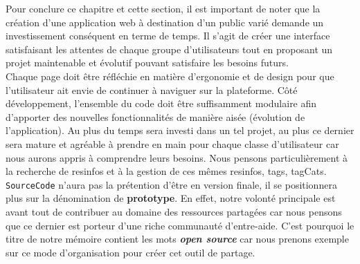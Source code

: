 Pour conclure ce chapitre et cette section, il est important de noter que la création d'une application web à destination d'un public varié demande un investissement conséquent en terme de temps. Il s'agit de créer une interface satisfaisant les attentes de chaque groupe d'utilisateurs tout en proposant un projet maintenable et évolutif pouvant satisfaire les besoins futurs.\\

Chaque page doit être réfléchie en matière d'ergonomie et de design pour que l'utilisateur ait envie de continuer à naviguer sur la plateforme. Côté développement, l'ensemble du code doit être suffisamment modulaire afin d'apporter des nouvelles fonctionnalités de manière aisée (évolution de l'application). Au plus du temps sera investi dans un tel projet, au plus ce dernier sera mature et agréable à prendre en main pour chaque classe d'utilisateur car nous aurons appris à comprendre leurs besoins. Nous pensons particulièrement à la recherche de \glspl{resinfo} et à la gestion de ces mêmes \glspl{resinfo}, \glspl{tag}, \glspl{tagCat}.\\

\texttt{SourceCode} n'aura pas la prétention d'être en version finale, il se positionnera plus sur la dénomination de \textbf{prototype}. En effet, notre volonté principale est avant tout de contribuer au domaine des ressources partagées car nous pensons que ce dernier est porteur d'une riche communauté d'entre-aide. C'est pourquoi le titre de notre mémoire contient les mots \textbf{\textit{open source}} car nous prenons exemple sur ce mode d'organisation pour créer cet outil de partage.
